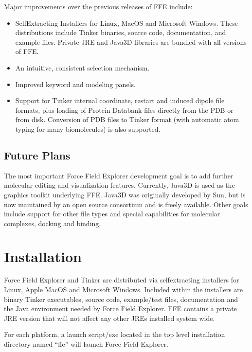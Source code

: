 \documentclass[letterpaper,11pt,english]{sphinxmanual}
\begin{document}
Major improvements over the previous releases of FFE include:
\begin{itemize}
\item {} 
Self\sphinxhyphen{}Extracting Installers for Linux, MacOS and Microsoft Windows. These distributions include Tinker binaries, source code, documentation, and example files. Private JRE and Java3D libraries are bundled with all versions of FFE.

\item {} 
An intuitive, consistent selection mechanism.

\item {} 
Improved keyword and modeling panels.

\item {} 
Support for Tinker internal coordinate, restart and induced dipole file formats, plus loading of Protein Databank files directly from the PDB or from disk. Conversion of PDB files to Tinker format (with automatic atom typing for many biomolecules) is also supported.

\end{itemize}


\section{Future Plans}
\label{\detokenize{text/introduction:future-plans}}
The most important Force Field Explorer development goal is to add further molecular editing and visualization features. Currently, Java3D is used as the graphics toolkit underlying FFE. Java3D was originally developed by Sun, but is now maintained by an open source consortium and is freely available. Other goals include support for other file types and special capabilities for molecular complexes, docking and binding.


\chapter{Installation}
\label{\detokenize{text/installation:installation}}\label{\detokenize{text/installation::doc}}
Force Field Explorer and Tinker are distributed via self\sphinxhyphen{}extracting installers for Linux, Apple MacOS and Microsoft Windows. Included within the installers are binary Tinker executables, source code, example/test files, documentation and the Java environment needed by Force Field Explorer. FFE contains a private JRE version that will not affect any other JREs installed system wide.

For each platform, a launch script/exe located in the top level installation directory named “ffe” will launch Force Field Explorer.
\end{document}
